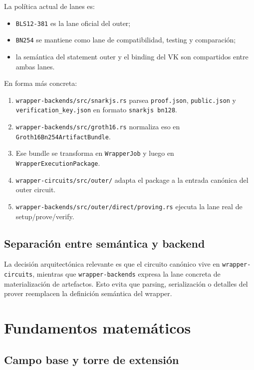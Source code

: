\documentclass[11pt,a4paper]{article}
\begin{document}
La pol\'itica actual de lanes es:

\begin{itemize}
  \item \texttt{BLS12-381} es la lane oficial del outer;
  \item \texttt{BN254} se mantiene como lane de compatibilidad, testing y comparaci\'on;
  \item la sem\'antica del statement outer y el binding del VK son compartidos entre ambas lanes.
\end{itemize}

En forma m\'as concreta:

\begin{enumerate}
  \item \texttt{wrapper-backends/src/snarkjs.rs} parsea \texttt{proof.json}, \texttt{public.json}
  y \texttt{verification\_key.json} en formato \texttt{snarkjs bn128}.
  \item \texttt{wrapper-backends/src/groth16.rs} normaliza eso en
  \texttt{Groth16Bn254ArtifactBundle}.
  \item Ese bundle se transforma en \texttt{WrapperJob} y luego en
  \texttt{WrapperExecutionPackage}.
  \item \texttt{wrapper-circuits/src/outer/} adapta el package a la entrada can\'onica del outer circuit.
  \item \texttt{wrapper-backends/src/outer/direct/proving.rs} ejecuta la lane real de setup/prove/verify.
\end{enumerate}

\subsection{Separaci\'on entre sem\'antica y backend}

La decisi\'on arquitect\'onica relevante es que el circuito can\'onico vive en
\texttt{wrapper-circuits}, mientras que \texttt{wrapper-backends} expresa la lane concreta de
materializaci\'on de artefactos. Esto evita que parsing, serializaci\'on o detalles del prover
reemplacen la definici\'on sem\'antica del wrapper.

\section{Fundamentos matem\'aticos}

\subsection{Campo base y torre de extensi\'on}
\end{document}
